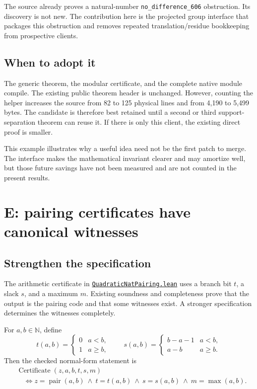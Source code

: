 \documentclass[11pt]{article}
\theoremstyle{remark}\newtheorem{remark}[proposition]{Remark}
\newcommand{\N}{\mathbb{N}}\newcommand{\Z}{\mathbb{Z}}\newcommand{\R}{\mathbb{R}}
\newcommand{\code}[1]{\nolinkurl{#1}}
\newcommand{\sref}[2]{\href{https://github.com/VladimirReshetnikov/ProveIt/blob/7fa06d530df54d4aeb2e18027409df082234c69e/#1}{#2}}
\newcommand{\source}[1]{\sref{Computability/DiophantineConsistency/Lean/DiophantineConsistency/#1.lean}{\code{#1.lean}}}
\begin{document}
The source already proves a natural-number \code{no_difference_606} obstruction. Its discovery is not new. The contribution here is the projected group interface that packages this obstruction and removes repeated translation/residue bookkeeping from prospective clients.

\subsection{When to adopt it}

The generic theorem, the modular certificate, and the complete native module compile. The existing public theorem header is unchanged. However, counting the helper increases the source from 82 to 125 physical lines and from 4,190 to 5,499 bytes. The candidate is therefore best retained until a second or third support-separation theorem can reuse it. If there is only this client, the existing direct proof is smaller.

This example illustrates why a useful idea need not be the first patch to merge. The interface makes the mathematical invariant clearer and may amortize well, but those future savings have not been measured and are not counted in the present results.

\section{E: pairing certificates have canonical witnesses}\label{sec:pairing}

\subsection{Strengthen the specification}

The arithmetic certificate in \source{QuadraticNatPairing} uses a branch bit \(t\), a slack \(s\), and a maximum \(m\). Existing soundness and completeness prove that the output is the pairing code and that some witnesses exist. A stronger specification determines the witnesses completely.

For \(a,b\in\N\), define
\[
 t(a,b)=\begin{cases}0&a<b,\\1&a\ge b,\end{cases}\qquad
 s(a,b)=\begin{cases}b-a-1&a<b,\\a-b&a\ge b.\end{cases}
\]
Then the checked normal-form statement is
\begin{align*}
 &\operatorname{Certificate}(z,a,b,t,s,m)\\
 &\quad\Longleftrightarrow
 z=\operatorname{pair}(a,b)\ \land\
 t=t(a,b)\ \land\ s=s(a,b)\ \land\ m=\max(a,b).
\end{align*}
\end{document}
